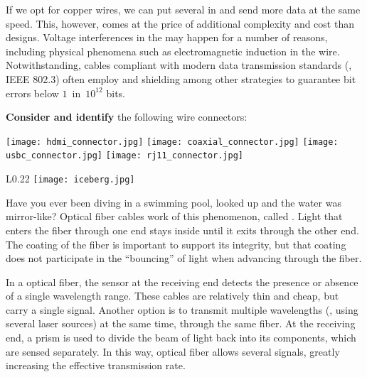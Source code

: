 If we opt for copper wires, we can put several in  and send more data at the same  speed.
This, however, comes at the price of additional complexity and cost than  designs. 
Voltage interferences in the  may happen for a number of reasons, 
including physical phenomena such as electromagnetic induction in the wire. 
Notwithstanding, cables compliant with modern data transmission standards (\eg, IEEE 802.3)
often employ  and shielding
among other strategies to guarantee bit errors below $1$~in~$10^{12}$ bits.

\begin{exercise}\label{ex:piercing:copper_connectors}
\textbf{Consider and identify} the following wire connectors:\\[-0.5cm]
\begin{center}
\texttt{[image: hdmi\_connector.jpg]}
\texttt{[image: coaxial\_connector.jpg]}
\texttt{[image: usbc\_connector.jpg]}
\texttt{[image: rj11\_connector.jpg]}
\end{center}
\end{exercise}

\begin{wrapfigure}{L}{0.22\linewidth}
\texttt{[image: iceberg.jpg]}
\end{wrapfigure}
Have you ever been diving in a swimming pool, looked up and the water was mirror-like?
Optical fiber cables work of this phenomenon, called .
Light that enters the fiber through one end 
stays inside until it exits through the other end. The coating of the fiber is important
to support its integrity, but that coating does not participate in the ``bouncing'' of 
light when advancing through the fiber.

In a  optical fiber, the sensor at the receiving end 
detects the presence or absence of a single wavelength range. These cables are relatively thin and cheap,
but carry a single signal.
% 
Another option is to transmit multiple wavelengths (\eg, using several laser sources) at the same time, 
through the same fiber. At the receiving end, a prism is used to divide the beam of light back into its
 components, which are sensed separately. 
In this way,  optical fiber allows 
several signals, greatly increasing the effective transmission rate.


